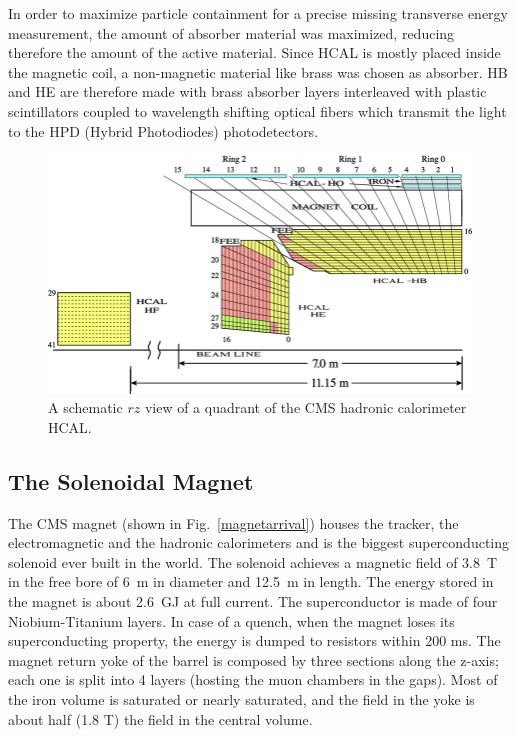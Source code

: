 In order to maximize particle containment for a precise missing transverse energy
measurement, the amount of absorber material was maximized, reducing therefore the
amount of the active material. Since HCAL is mostly placed inside the magnetic coil,
a non-magnetic material like brass was chosen as absorber. HB and HE are therefore
made with brass absorber layers interleaved with plastic scintillators
coupled to wavelength shifting optical fibers which transmit the light to the HPD (Hybrid
Photodiodes) photodetectors.
\begin{figure}
\centering
\includegraphics[scale= 0.4]{../Cap2/hcal}
\caption{A schematic $rz$ view of a quadrant of the CMS hadronic calorimeter HCAL.}
\label{hcal}
\end{figure}


\subsection*{The Solenoidal Magnet}
The CMS magnet (shown in Fig.~\ref{magnetarrival}) houses the tracker, the electromagnetic and the hadronic
calorimeters and is the biggest superconducting solenoid ever built in the world. The solenoid
achieves a magnetic field of 3.8~T in the free bore of 6~m in diameter and 12.5~m in length.
The energy stored in the magnet is about 2.6~GJ at full current. The superconductor is
made of four Niobium-Titanium layers. In case of a quench, when the magnet loses its
superconducting property, the energy is dumped to resistors within 200 ms. The magnet
return yoke of the barrel is composed by three sections along the z-axis; each one is
split into 4 layers (hosting the muon chambers in the gaps). Most of the iron volume is
saturated or nearly saturated, and the field in the yoke is about half (1.8 T) the
field in the central volume.

